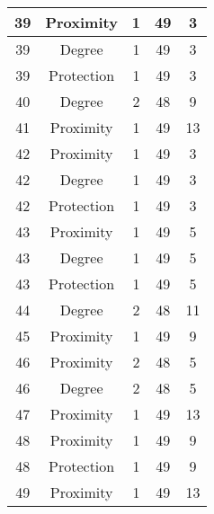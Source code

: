 \documentclass[results.tex]{subfiles}
\begin{document}
\begin{center}
\begin{tabular}{| c || c | c | c | c |}
    \hline
    39 & Proximity & 1 & 49 & 3 \\ 
    \hline
    39 & Degree & 1 & 49 & 3 \\ 
    \hline
    39 & Protection & 1 & 49 & 3 \\ 
    \hline
    40 & Degree & 2 & 48 & 9 \\ 
    \hline
    41 & Proximity & 1 & 49 & 13 \\ 
    \hline
    42 & Proximity & 1 & 49 & 3 \\ 
    \hline
    42 & Degree & 1 & 49 & 3 \\ 
    \hline
    42 & Protection & 1 & 49 & 3 \\ 
    \hline
    43 & Proximity & 1 & 49 & 5 \\ 
    \hline
    43 & Degree & 1 & 49 & 5 \\ 
    \hline
    43 & Protection & 1 & 49 & 5 \\ 
    \hline
    44 & Degree & 2 & 48 & 11 \\ 
    \hline
    45 & Proximity & 1 & 49 & 9 \\ 
    \hline
    46 & Proximity & 2 & 48 & 5 \\ 
    \hline
    46 & Degree & 2 & 48 & 5 \\ 
    \hline
    47 & Proximity & 1 & 49 & 13 \\ 
    \hline
    48 & Proximity & 1 & 49 & 9 \\ 
    \hline
    48 & Protection & 1 & 49 & 9 \\ 
    \hline
    49 & Proximity & 1 & 49 & 13 \\ 
    \hline   \end{tabular}
\end{center}
\end{document}
